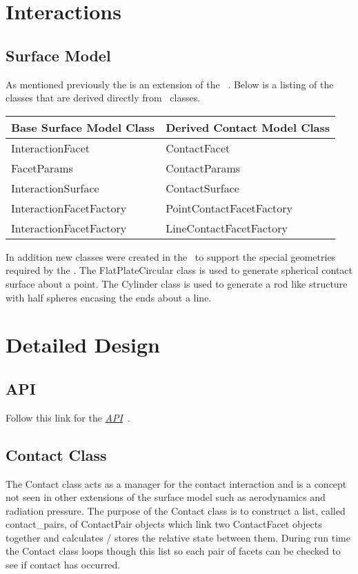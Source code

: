 \section{Interactions}

\subsection{Surface Model}
As mentioned previously the \ModelDesc is an extension of the \SURFACEMODEL~\cite{dynenv:SURFACEMODEL}.  Below is a listing of the \ModelDesc classes that are derived directly from \SURFACEMODEL\ classes.\\

\begin{tabular}{||l|l|} \hline
{\bf Base Surface Model Class} & {\bf Derived Contact Model Class} \\ \hline \hline
InteractionFacet & ContactFacet \\ \hline
FacetParams & ContactParams \\ \hline
InteractionSurface & ContactSurface \\ \hline
InteractionFacetFactory & PointContactFacetFactory \\ \hline
InteractionFacetFactory & LineContactFacetFactory \\ \hline
\end{tabular}

In addition new classes were created in the \SURFACEMODEL\ to support the special geometries required by the \ModelDesc. The FlatPlateCircular class is used to generate spherical contact surface about a point. The Cylinder class is used to generate a rod like structure with half spheres encasing the ends about a line.

\section{Detailed Design}
\subsection{API}
Follow this link for the
\href{file:refman.pdf}{\em \ModelDesc API}~\cite{api:contact}.


\subsection{Contact Class}
The Contact class acts as a manager for the contact interaction and is a concept not seen in other extensions of the surface model such as aerodynamics and radiation pressure. The purpose of the Contact class is to construct a list, called contact\_pairs, of ContactPair objects which link two ContactFacet objects together and calculates / stores the relative state between them. During run time the Contact class loops though this list so each pair of facets can be checked to see if contact has occurred.

